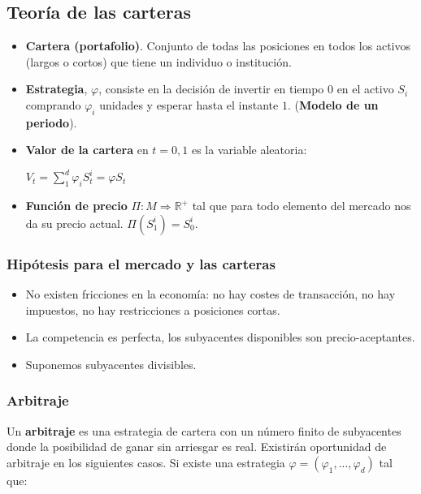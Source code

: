 \documentclass[
10pt, %
a4paper, %
oneside, %
headinclude,footinclude, %
BCOR5mm, %
]{scrartcl}
\newcommand{\n}[1]{\textbf{#1}}
\newcommand{\sub}[1]{_{#1}}
\newcommand{\pot}[1]{^{#1}}
\newcommand{\f}[1]{{\large{${#1}$}}}
\newcommand{\sumatorio}[2]{\sum_{#1}^{#2}}
\newcommand{\ent}[0]{\Rightarrow}
\newcommand{\rn}[1]{\mathbb{R}\pot{#1}}
\newcounter{ex}
\begin{document}
	\subsection{Teoría de las carteras}

		\begin{itemize}
			\item \n{Cartera (portafolio)}. Conjunto de todas las posiciones en todos los activos (largos o cortos) que tiene un individuo o institución.
			\item \n{Estrategia}, \f{\varphi}, consiste en la decisión de invertir en tiempo 0 en el activo \f{S\sub{i}} comprando \f{\varphi\sub{i}} unidades y esperar hasta el instante \f{1}. (\n{Modelo de un periodo}).
			\item \n{Valor de la cartera} en \f{t = 0,1} es la variable aleatoria:
			\begin{center} \f{V\sub{t} = \sumatorio{1}{d} \varphi\sub{i}S\sub{t}\pot{i} = \varphi S\sub{t}} \end{center}
			\item \n{Función de precio} \f{\Pi: M \ent \rn{+}} tal que para todo elemento del mercado nos da su precio actual. \f{\Pi(S\pot{i}\sub{1}) = S\sub{0}\pot{i}}.
		\end{itemize}

		\subsubsection{Hipótesis para el mercado y las carteras}

			\begin{itemize}
				\item No existen fricciones en la economía: no hay costes de transacción, no hay impuestos, no hay restricciones a posiciones cortas. 
				\item La competencia es perfecta, los subyacentes disponibles son precio-aceptantes. 
				\item Suponemos subyacentes divisibles.

			\end{itemize}

			\newpage

	\subsubsection{Arbitraje}

		Un \n{arbitraje} es una estrategia de cartera con un número finito de subyacentes donde la posibilidad de ganar sin arriesgar es real. Existirán oportunidad de arbitraje en los siguientes casos. Si existe una estrategia \f{\varphi = (\varphi\sub{1},...,\varphi\sub{d})} tal que:
\end{document}
